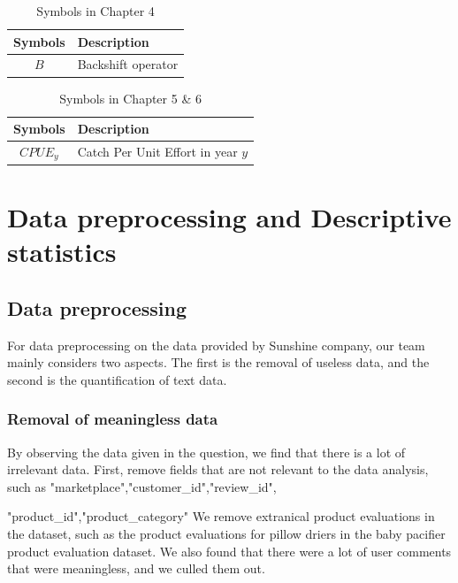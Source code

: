 \documentclass{mcmthesis}
\begin{document}
\begin{table}[htbp]
\centering
\caption{Symbols in Chapter 4}
\begin{tabular}{cp{}}
\toprule
 Symbols & Description\\
\midrule
$B$ &  Backshift operator\\

\bottomrule
\end{tabular}
\end{table}
\begin{table}[htbp]
\centering
\caption{Symbols in Chapter 5 \& 6}
\begin{tabular}{cp{}}
\toprule
 Symbols & Description\\
\midrule
$CPUE_{y}$ & Catch Per Unit Effort in year $y$\\

\bottomrule
\end{tabular}
\end{table}





\section{Data preprocessing and Descriptive statistics }
\subsection{Data preprocessing}
For data preprocessing on the data provided by Sunshine company, our team mainly considers
two aspects. The first is the removal of useless data, and the second is the quantification of text data.

\subsubsection{Removal of meaningless data}

By observing the data given in the question, we find that there is a lot of irrelevant data. First, remove fields that are not relevant to the data analysis, such as "marketplace","customer\_id","review\_id",

"product\_id","product\_category"
We remove extranical product evaluations in the dataset, such as the product evaluations for pillow driers in the baby pacifier product evaluation dataset. We also found that there were a lot of user comments that were meaningless, and we culled them out.
\end{document}
